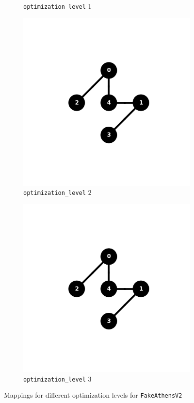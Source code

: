 \documentclass[11pt]{article}
\begin{document}
\begin{figure}[hbtp]
\begin{subfigure}{0.24\linewidth}
        \caption{\texttt{optimization\_level} $1$}
    \end{subfigure}
    \begin{subfigure}{0.24\linewidth}
        \centering
        \includegraphics[width=\linewidth]{outputs/routing_FakeAthensV2_2.png}
        \caption{\texttt{optimization\_level} $2$}
    \end{subfigure}
    \begin{subfigure}{0.24\linewidth}
        \centering
        \includegraphics[width=\linewidth]{outputs/routing_FakeAthensV2_3.png}
        \caption{\texttt{optimization\_level} $3$}
    \end{subfigure}
    \caption{Mappings for different optimization levels for \texttt{FakeAthensV2}}
    \label{fig:routing_athens}
\end{figure}
\end{document}
